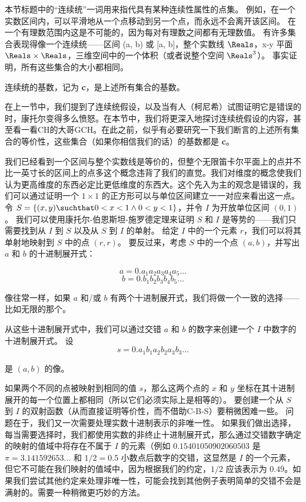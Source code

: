 本节标题中的“连续统”一词用来指代具有某种连续性属性的点集。
例如，在一个实数区间内，可以平滑地从一个点移动到另一个点，而永远不会离开该区间。
在一个有理数范围内这是不可能的，因为每对有理数之间都有无理数值。
有许多集合表现得像一个连续统——区间 (a, b) 或 [a, b]，整个实数线 $\Reals$，x-y 平面 $\Reals \times \Reals$，三维空间中的一个体积（或者说整个空间 $\Reals^3$）。
事实证明，所有这些集合的大小都相同。

连续统的基数，记为 {\bf c}，是上述所有集合的基数。

在上一节中，我们提到了连续统假设，以及当有人（柯尼希）试图证明它是错误的时，康托尔变得多么愤怒。在本节中，我们将更深入地探讨连续统假设的内容，甚至看一看CH的大哥GCH。在此之前，似乎有必要研究一下我们断言的上述所有集合的等价性，这些集合（如果你相信我们的话）的基数都是 {\bf c}。

我们已经看到一个区间与整个实数线是等价的，但整个无限笛卡尔平面上的点并不比一英寸长的区间上的点多这个概念违背了我们的直觉。我们对维度的概念使我们认为更高维度的东西必定比更低维度的东西大。这个先入为主的观念是错误的，我们可以通过证明一个 $1 \times 1$ 的正方形可以与单位区间建立一一对应来看出这一点。令 $S = \{ (x, y) \suchthat 0 < x < 1 \land 0 < y < 1 \}$，并令 $I$ 为开放单位区间 $(0, 1)$。
我们可以使用康托尔-伯恩斯坦-施罗德定理来证明 $S$ 和 $I$ 是等势的——我们只需要找到从 $I$ 到 $S$ 以及从 $S$ 到 $I$ 的单射。
给定 $I$ 中的一个元素 $r$，我们可以将其单射地映射到 $S$ 中的点 $(r, r)$。
要反过来，考虑 $S$ 中的一个点 $(a, b)$，并写出 $a$ 和 $b$ 的十进制展开式：

\[ a = 0.a_1a_2a_3a_4a_5\ldots \]
\[ b = 0.b_1b_2b_3b_4b_5\ldots \]

\noindent 像往常一样，如果 $a$ 和/或 $b$ 有两个十进制展开式，我们将做一个一致的选择——比如无限的那个。

从这些十进制展开式中，我们可以通过交错 $a$ 和 $b$ 的数字来创建一个 $I$ 中数字的十进制展开式。
设
\[ s = 0.a_1b_1a_2b_2a_3b_3 \ldots \]

\noindent 是 $(a, b)$ 的像。

如果两个不同的点被映射到相同的值 $s$，那么这两个点的 $x$ 和 $y$ 坐标在其十进制展开的每一个位置上都相同（所以它们必须实际上是相等的）。
要创建一个从 $S$ 到 $I$ 的双射函数（从而直接证明等价性，而不借助C-B-S）要稍微困难一些。
问题在于，我们又一次需要处理实数十进制表示的非唯一性。
如果我们做出选择，每当需要选择时，我们都使用实数的非终止十进制展开式，那么通过交错数字确定的映射的值域中将存在不属于 $I$ 的元素（例如 $0.15401050902060503$ 是 $\pi = 3.141592653\ldots$ 和 $1/2 = 0.5$ 小数点后数字的交错，这显然是 $I$ 的一个元素，但它不可能在我们映射的值域中，因为根据我们的约定，$1/2$ 应该表示为 $0.4\overline{9}$。如果我们尝试其他约定来处理非唯一性，可能会找到其他例子表明简单的交错不会是满射的。需要一种稍微更巧妙的方法。

